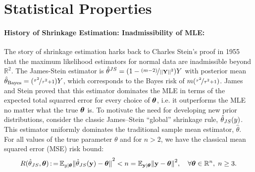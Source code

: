 \documentclass[11pt]{article}
\renewcommand{\E}{\mathbb E}
\numberwithin{equation}{section}
\begin{document}
\section{Statistical Properties}

\paragraph{History of Shrinkage Estimation: Inadmissibility of MLE:} The story of shrinkage estimation harks back to Charles Stein's proof in 1955 that the maximum likelihood estimators for normal data are inadmissible beyond $\mathbb{R}^2$. The James-Stein estimator is $\hat{\theta}^{JS} = (1 - \nicefrac{(m-2)}{\left|\left|{\bf Y}\right|\right|^2})Y$ with posterior mean $\hat{\theta}_{\mathrm{Bayes}} = (\nicefrac{\tau^2}{\tau^2+1}) Y$, which corresponds to the Bayes risk of $m(\nicefrac{\tau^2}{\tau^2+1})$. %
James and Stein proved that this estimator dominates the MLE in terms of the expected total squarred error for every choice of $\boldsymbol{\theta}$, i.e. it outperforms the MLE no matter what the true $\boldsymbol{\theta}$ is. To motivate the need for developing new prior distributions, consider the classic James--Stein ``global'' shrinkage rule, ${\hat{\theta}}_{JS}{}(y)$. This estimator uniformly dominates the traditional sample mean estimator, $\hat{\theta}$. For all values of the true parameter $\theta$ and for $n>2$, we have the classical mean squared error (MSE) risk bound:
\[
R(\estJs, \btheta) \defeq \E_{y \mid \btheta} {\Vert \estJs(\y) - \btheta \Vert}^2 < n = \E_{\y \mid \btheta} {\Vert \y - \btheta \Vert}^2, \quad \forall \btheta \in \mathbb{R}^n, \; n \ge 3.
\]
\end{document}
